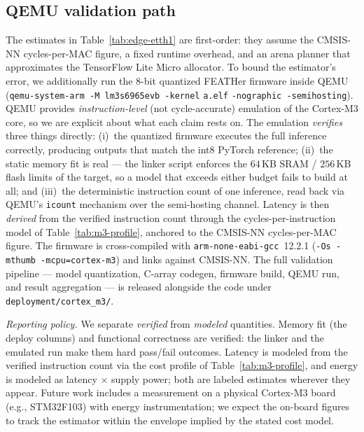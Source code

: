 \documentclass[journal]{IEEEtran}
\theoremstyle{remark}
\begin{document}
\subsection{QEMU validation path}
\label{subsec:edge-qemu}
The estimates in Table~\ref{tab:edge-etth1} are first-order: they
assume the CMSIS-NN cycles-per-MAC figure, a fixed runtime overhead,
and an arena planner that approximates the Tensor\-Flow Lite Micro
allocator. To bound the estimator's error, we additionally run the
$8$-bit quantized FEATHer firmware inside QEMU
(\texttt{qemu-system-arm -M lm3s6965evb -kernel} \texttt{a.elf}
\texttt{-nographic -semihosting}). QEMU provides
\emph{instruction-level} (not cycle-accurate) emulation of the
Cortex-M3 core, so we are explicit about what each claim rests on.
The emulation \emph{verifies} three things directly:
(i)~the quantized firmware executes the full inference correctly,
producing outputs that match the int8 PyTorch reference;
(ii)~the static memory fit is real --- the linker script enforces
the $64$\,KB SRAM / $256$\,KB flash limits of the target, so a
model that exceeds either budget fails to build at all; and
(iii)~the deterministic instruction count of one inference, read
back via QEMU's \texttt{icount} mechanism over the semi-hosting
channel. Latency is then \emph{derived} from the verified
instruction count through the cycles-per-instruction model of
Table~\ref{tab:m3-profile}, anchored to the CMSIS-NN
cycles-per-MAC figure. The firmware is cross-compiled with
\texttt{arm-none-eabi-gcc}~12.2.1
(\texttt{-Os -mthumb -mcpu=cortex-m3}) and links against CMSIS-NN.
The full validation pipeline --- model quantization, C-array
codegen, firmware build, QEMU run, and result aggregation --- is
released alongside the code under \texttt{deployment/cortex\_m3/}.

\emph{Reporting policy.} We separate \emph{verified} from
\emph{modeled} quantities. Memory fit (the deploy columns) and
functional correctness are verified: the linker and the emulated
run make them hard pass/fail outcomes. Latency is modeled from the
verified instruction count via the cost profile of
Table~\ref{tab:m3-profile}, and energy is modeled as latency
$\times$ supply power; both are labeled estimates wherever they
appear. Future work includes a measurement on a physical Cortex-M3
board (e.g., STM32F103) with energy instrumentation; we expect the
on-board figures to track the estimator within the envelope implied
by the stated cost model.

\end{document}
